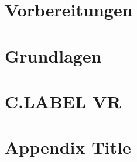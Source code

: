 \documentclass[12pt]{scrreprt}
\begin{document}
\chapter{Vorbereitungen}


\chapter{Grundlagen}


\chapter{C.LABEL VR}




%


\appendix
\chapter{Appendix Title}
%





\end{document}
